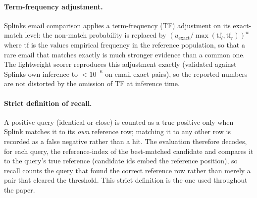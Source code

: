 \documentclass[11pt]{article}
\begin{document}
\paragraph{Term-frequency adjustment.} Splink\textquotesingle{}s email comparison applies a term-frequency (TF) adjustment on its exact-match level: the non-match probability is replaced by $(u_{\text{exact}}/\max(\mathrm{tf}_l,\mathrm{tf}_r))^{w}$ where $\mathrm{tf}$ is the value\textquotesingle{}s empirical frequency in the reference population, so that a rare email that matches exactly is much stronger evidence than a common one. The lightweight scorer reproduces this adjustment exactly (validated against Splink\textquotesingle{}s own inference to $<10^{-6}$ on email-exact pairs), so the reported numbers are not distorted by the omission of TF at inference time.

\paragraph{Strict definition of recall.} A positive query (identical or close) is counted as a true positive only when Splink matches it to its \emph{own} reference row; matching it to any other row is recorded as a false negative rather than a hit. The evaluation therefore decodes, for each query, the reference-index of the best-matched candidate and compares it to the query's true reference (candidate ids embed the reference position), so recall counts the query that found the correct reference row rather than merely a pair that cleared the threshold. This strict definition is the one used throughout the paper.
\end{document}
